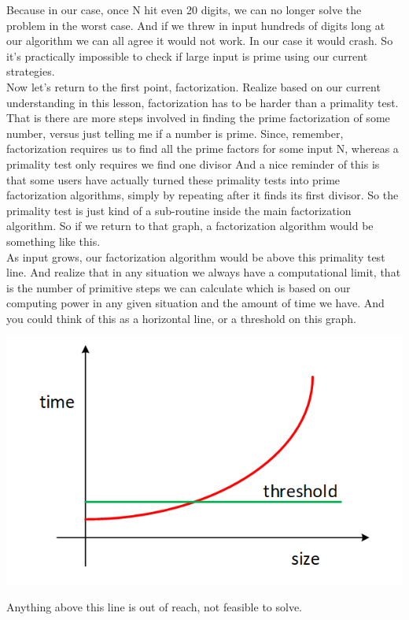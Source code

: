 \documentclass{report}
\begin{document}
Because in our case, once N hit even 20 digits, we can no longer solve the problem in the worst case. And if we threw in input hundreds of digits long at our algorithm we can all agree it would not work. In our case it would crash. So it's practically impossible to check if large input is prime using our current strategies. \\
Now let's return to the first point, factorization. Realize based on our current understanding in this lesson, factorization has to be harder than a primality test. \\
That is there are more steps involved in finding the prime factorization of some number, versus just telling me if a number is prime. Since, remember, factorization requires us to find all the prime factors for some input N, whereas a primality test only requires we find one divisor And a nice reminder of this is that some users have actually turned these primality tests into prime factorization algorithms, simply by repeating after it finds its first divisor. So the primality test is just kind of a sub-routine inside the main factorization algorithm. So if we return to that graph, a factorization algorithm would be something like this.\\
As input grows, our factorization algorithm would be above this primality test line. And realize that in any situation we always have a computational limit, that is the number of primitive steps we can calculate which is based on our computing power in any given situation and the amount of time we have. And you could think of this as a horizontal line, or a threshold on this graph.
\begin{center}
	\includegraphics[scale=1]{69.png}
\end{center}
 Anything above this line is out of reach, not feasible to solve. \\
\end{document}
